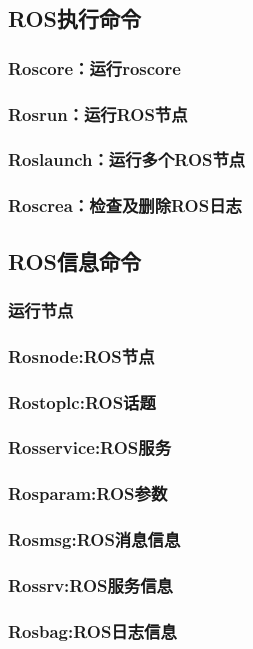 \documentclass[geye,green,kindle,cn]{elegantnote}
\begin{document}
\subsection{ROS执行命令}
\subsubsection{Roscore：运行roscore}
\subsubsection{Rosrun：运行ROS节点}
\subsubsection{Roslaunch：运行多个ROS节点}
\subsubsection{Roscrea：检查及删除ROS日志}
\subsection{ROS信息命令}
\subsubsection{运行节点}
\subsubsection{Rosnode:ROS节点}
\subsubsection{Rostoplc:ROS话题}
\subsubsection{Rosservice:ROS服务}
\subsubsection{Rosparam:ROS参数}
\subsubsection{Rosmsg:ROS消息信息}
\subsubsection{Rossrv:ROS服务信息}
\subsubsection{Rosbag:ROS日志信息}
\end{document}

